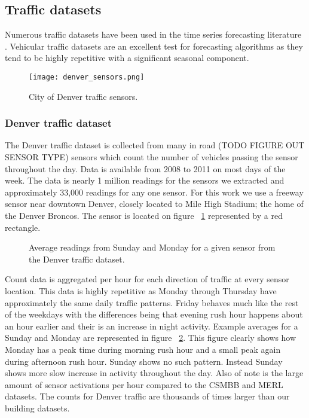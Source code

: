 \subsection{Traffic datasets}
Numerous traffic datasets have been used in the time series forecasting literature \cite{Kamarianakis2003, Smith2002, Williams2003, Zhang2009}.  Vehicular traffic datasets are an excellent test for forecasting algorithms as they tend to be highly repetitive with a significant seasonal component.  

\begin{figure}[t!]
	\begin{center}
		\texttt{[image: denver\_sensors.png]}
	\end{center}
	\caption{City of Denver traffic sensors.}
	\label{fig:denvertraffic}
\end{figure}


\subsubsection{Denver traffic dataset}
The Denver traffic dataset is collected from many in road (TODO FIGURE OUT SENSOR TYPE) sensors which count the number of vehicles passing the sensor throughout the day.  Data is available from 2008 to 2011 on most days of the week.  The data is nearly 1 million readings for the sensors we extracted and approximately 33,000 readings for any one sensor.  For this work we use a freeway sensor near downtown Denver, closely located to Mile High Stadium; the home of the Denver Broncos.  The sensor is located on figure ~\ref{fig:denvertraffic} represented by a red rectangle.

\begin{figure}[h]
	\begin{center}
	\end{center}
	\caption{Average readings from Sunday and Monday for a given sensor from the Denver traffic dataset.}
	\label{fig:denver_day_raw}
\end{figure}

Count data is aggregated per hour for each direction of traffic at every sensor location.  This data is highly repetitive as Monday through Thursday have approximately the same daily traffic patterns.  Friday behaves much like the rest of the weekdays with the differences being that evening rush hour happens about an hour earlier and their is an increase in night activity.   Example averages for a Sunday and Monday are represented in figure ~\ref{fig:denver_day_raw}.  This figure clearly shows how Monday has a peak time during morning rush hour and a small peak again during afternoon rush hour.  Sunday shows no such pattern.  Instead Sunday shows more slow increase in activity throughout the day.  Also of note is the large amount of sensor activations per hour compared to the CSMBB and MERL datasets.  The counts for Denver traffic are thousands of times larger than our building datasets.

